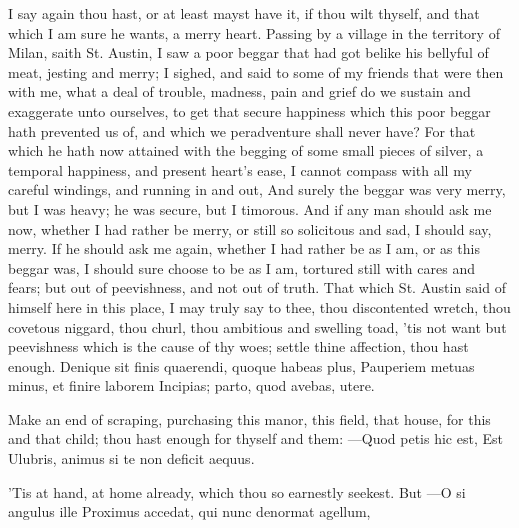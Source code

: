 {I say again thou hast, or at least mayst have it, if thou wilt thyself,
and that which I am sure he wants, a merry heart. Passing by a village
in the territory of Milan, saith St. Austin, I saw a poor beggar
that had got belike his bellyful of meat, jesting and merry; I sighed,
and said to some of my friends that were then with me, what a deal of
trouble, madness, pain and grief do we sustain and exaggerate unto
ourselves, to get that secure happiness which this poor beggar hath
prevented us of, and which we peradventure shall never have? For that
which he hath now attained with the begging of some small pieces of
silver, a temporal happiness, and present heart's ease, I cannot
compass with all my careful windings, and running in and out, And
surely the beggar was very merry, but I was heavy; he was secure, but I
timorous. And if any man should ask me now, whether I had rather be
merry, or still so solicitous and sad, I should say, merry. If he
should ask me again, whether I had rather be as I am, or as this beggar
was, I should sure choose to be as I am, tortured still with cares and
fears; but out of peevishness, and not out of truth. That which St.
Austin said of himself here in this place, I may truly say to thee,
thou discontented wretch, thou covetous niggard, thou churl, thou
ambitious and swelling toad, 'tis not want but peevishness which is the
cause of thy woes; settle thine affection, thou hast enough.
Denique sit finis quaerendi, quoque habeas plus,
Pauperiem metuas minus, et finire laborem
Incipias; parto, quod avebas, utere.

Make an end of scraping, purchasing this manor, this field, that house,
for this and that child; thou hast enough for thyself and them:
---Quod petis hic est,
Est Ulubris, animus si te non deficit aequus.

'Tis at hand, at home already, which thou so earnestly seekest. But
---O si angulus ille
Proximus accedat, qui nunc denormat agellum,

}
